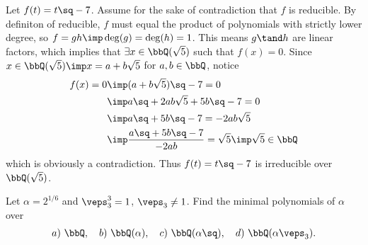 \documentclass{article}
\begin{document}
\begin{solution}
Let $ f(t) = t\sq - 7 $.
Assume for the sake of contradiction that $ f $ is reducible.
By definiton of reducible, $ f $ must equal the product of polynomials with strictly lower degree, so $ f=gh \imp \deg(g) = \deg(h) = 1 $.
This means $ g\tand h $ are linear factors, which implies that $ \exists x\in \bbQ(\sqrt 5) $ such that $ f(x) = 0 $.
Since $ x\in \bbQ(\sqrt 5) \imp x=a+b\sqrt 5$ for $ a,b\in \bbQ $, notice \begin{align*}
  f(x) = 0 &\imp (a+b\sqrt{5})\sq - 7 = 0 \\
  &\imp a\sq + 2ab\sqrt 5 + 5b\sq - 7 = 0 \\
  &\imp a\sq + 5b\sq - 7 = - 2ab\sqrt 5 \\
  &\imp \frac{a\sq + 5b\sq - 7}{-2ab} = \sqrt 5 \imp \sqrt 5\in \bbQ
\end{align*}
which is obviously a contradiction.
Thus $ f(t) = t\sq - 7 $ is irreducible over $ \bbQ(\sqrt 5) $.
\end{solution}

\begin{subexercise}
Let $ \alpha=2^{1/6} $ and $ \veps_3^3=1 $, $ \veps_3\neq 1 $. Find the minimal polynomials of $ \alpha $ over \begin{align*}
  a)\ \bbQ, \quad b)\ \bbQ(\alpha), \quad c)\ \bbQ(\alpha\sq), \quad d)\ \bbQ(\alpha\veps_3).
\end{align*}
\end{subexercise}
\end{document}
